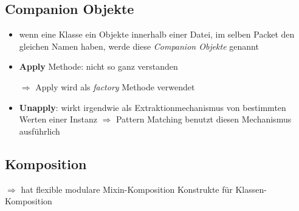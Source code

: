 \subsection{Companion Objekte}
\begin{itemize}
  \item wenn eine Klasse \und ein Objekte innerhalb einer Datei, im selben
  Packet den gleichen Namen haben, werde diese \textit{Companion Objekte}
  genannt
  \item \textbf{Apply} Methode: nicht so ganz verstanden
  
  
  
  $\Rightarrow$ Apply wird als \textit{factory} Methode verwendet
  
  \item \textbf{Unapply}: wirkt irgendwie als Extraktionmechanismus von
  bestimmten Werten einer Instanz $\Rightarrow$ Pattern Matching
  benutzt diesen Mechanismus ausführlich
  
  
\end{itemize}


\subsection{Komposition}
$\Rightarrow$ hat flexible modulare Mixin-Komposition Konstrukte für 
Klassen-Komposition


